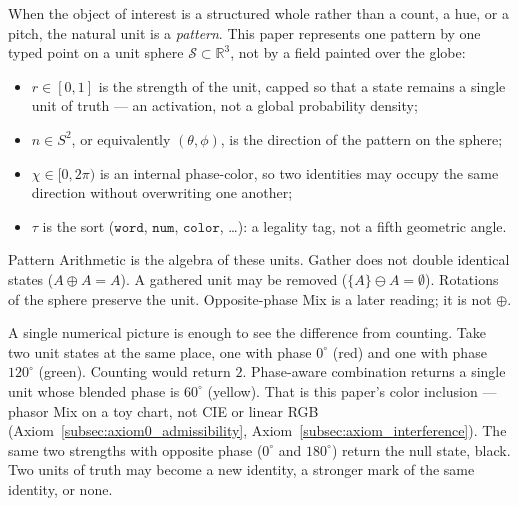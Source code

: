\documentclass[12pt, a4paper]{article}
\begin{document}
When the object of interest is a structured whole rather than a
count, a hue, or a pitch, the natural unit is a \emph{pattern}.
This paper represents one pattern by one typed point on a unit
sphere $\mathcal{S} \subset \mathbb{R}^3$, not by a field painted over the globe:
\begin{itemize}
    \item $r \in [0, 1]$ is the strength of the unit, capped so that a state remains a single unit of truth --- an activation, not a global probability density;
    \item $\hat n \in S^2$, or equivalently $(\theta, \phi)$, is the direction of the pattern on the sphere;
    \item $\chi \in [0, 2\pi)$ is an internal phase-color, so two identities may occupy the same direction without overwriting one another;
    \item $\tau$ is the sort ($\mathtt{word}$, $\mathtt{num}$, $\mathtt{color}$, \ldots): a legality tag, not a fifth geometric angle.
\end{itemize}
Pattern Arithmetic is the algebra of these units. Gather does not double identical states ($A \oplus A = A$). A gathered unit may be removed ($\{A\} \ominus A = \emptyset$). Rotations of the sphere preserve the unit. Opposite-phase Mix is a later reading; it is not $\oplus$.

A single numerical picture is enough to see the difference from counting. Take two unit states at the same place, one with phase $0^\circ$ (red) and one with phase $120^\circ$ (green). Counting would return $2$. Phase-aware combination returns a single unit whose blended phase is $60^\circ$ (yellow). That is this paper's color inclusion --- phasor Mix on a toy chart, not CIE or linear RGB (Axiom~\ref{subsec:axiom0_admissibility}, Axiom~\ref{subsec:axiom_interference}). The same two strengths with opposite phase ($0^\circ$ and $180^\circ$) return the null state, black. Two units of truth may become a new identity, a stronger mark of the same identity, or none.
\end{document}
